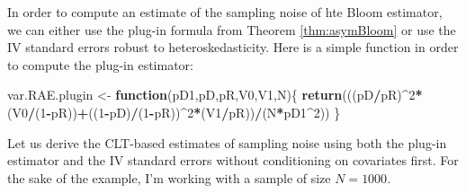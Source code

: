 \documentclass[]{book}
\newenvironment{Shaded}{\begin{snugshade}}{\end{snugshade}}
\newcommand{\KeywordTok}[1]{\textcolor[rgb]{0.13,0.29,0.53}{\textbf{#1}}}
\newcommand{\DecValTok}[1]{\textcolor[rgb]{0.00,0.00,0.81}{#1}}
\newcommand{\StringTok}[1]{\textcolor[rgb]{0.31,0.60,0.02}{#1}}
\newcommand{\ControlFlowTok}[1]{\textcolor[rgb]{0.13,0.29,0.53}{\textbf{#1}}}
\newcommand{\OperatorTok}[1]{\textcolor[rgb]{0.81,0.36,0.00}{\textbf{#1}}}
\newcommand{\NormalTok}[1]{#1}
\theoremstyle{definition}
\theoremstyle{definition}
\theoremstyle{definition}
\theoremstyle{remark}
\let\BeginKnitrBlock\begin \let\EndKnitrBlock\end
\begin{document}
\BeginKnitrBlock{remark}
\iffalse{} {Remark. } \fi{}In order to compute an estimate of the
sampling noise of hte Bloom estimator, we can either use the plug-in
formula from Theorem \ref{thm:asymBloom} or use the IV standard errors
robust to heteroskedasticity. Here is a simple function in order to
compute the plug-in estimator:
\EndKnitrBlock{remark}

\begin{Shaded}
\begin{Highlighting}[]
\NormalTok{var.RAE.plugin <-}\StringTok{ }\ControlFlowTok{function}\NormalTok{(pD1,pD,pR,V0,V1,N)\{}
  \KeywordTok{return}\NormalTok{(((pD}\OperatorTok{/}\NormalTok{pR)}\OperatorTok{^}\DecValTok{2}\OperatorTok{*}\NormalTok{(V0}\OperatorTok{/}\NormalTok{(}\DecValTok{1}\OperatorTok{-}\NormalTok{pR))}\OperatorTok{+}\NormalTok{((}\DecValTok{1}\OperatorTok{-}\NormalTok{pD)}\OperatorTok{/}\NormalTok{(}\DecValTok{1}\OperatorTok{-}\NormalTok{pR))}\OperatorTok{^}\DecValTok{2}\OperatorTok{*}\NormalTok{(V1}\OperatorTok{/}\NormalTok{pR))}\OperatorTok{/}\NormalTok{(N}\OperatorTok{*}\NormalTok{pD1}\OperatorTok{^}\DecValTok{2}\NormalTok{))}
\NormalTok{\}}
\end{Highlighting}
\end{Shaded}

\BeginKnitrBlock{example}
\protect\hypertarget{exm:unnamed-chunk-104}{}{\label{exm:unnamed-chunk-104}
}Let us derive the CLT-based estimates of sampling noise using both the
plug-in estimator and the IV standard errors without conditioning on
covariates first. For the sake of the example, I'm working with a sample
of size \(N=1000\).
\EndKnitrBlock{example}
\end{document}
